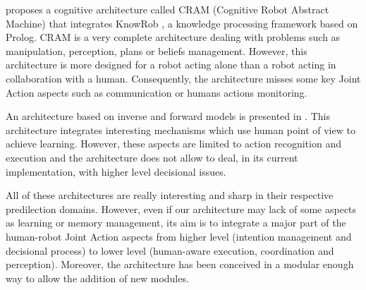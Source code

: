 \documentclass[english,a4paper,11pt,twoside]{StyleThese}
\begin{document}
\cite{beetz2010cram} proposes a cognitive architecture called CRAM (Cognitive Robot Abstract Machine) that integrates KnowRob \cite{tenorth2013knowrob}, a knowledge processing framework based on Prolog. CRAM is a very complete architecture dealing with problems such as manipulation, perception, plans or beliefs management. However, this architecture is more designed for a robot acting alone than a robot acting in collaboration with a human. Consequently, the architecture misses some key Joint Action aspects such as communication or humans actions monitoring.

An architecture based on inverse and forward models is presented in \cite{demiris2006hierarchical}. This architecture integrates interesting mechanisms which use human point of view to achieve learning. However, these aspects are limited to action recognition and execution and the architecture does not allow to deal, in its current implementation, with higher level decisional issues.

All of these architectures are really interesting and sharp in their respective predilection domains. However, even if our architecture may lack of some aspects as learning or memory management, its aim is to integrate a major part of the human-robot Joint Action aspects from higher level (intention management and decisional process) to lower level (human-aware execution, coordination and perception). Moreover, the architecture has been conceived in a modular enough way to allow the addition of new modules.

\ifdefined{}
\else


\end{document}

